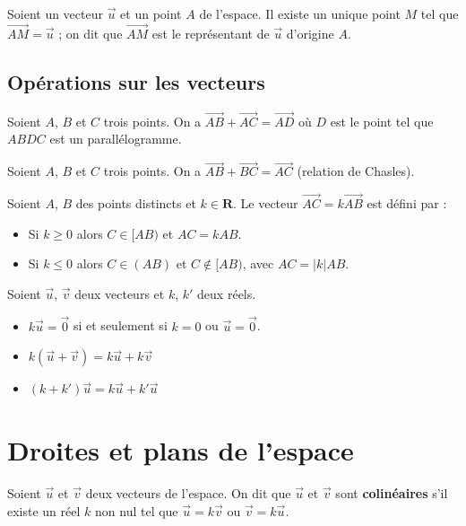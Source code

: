 \documentclass[11pt,a4paper,openany]{book}
\theoremstyle{definition}
\newcommand{\vc}[1]{\overrightarrow{#1}}
\begin{document}
    \begin{Théorème}
        Soient un vecteur $\vc{u}$ et un point $A$ de l'espace. Il existe un unique point $M$
        tel que $\vc{AM}=\vc{u}$ ; on dit que $\vc{AM}$ est le représentant de $\vc{u}$
        d'origine $A$.
    \end{Théorème}

    \subsection{Opérations sur les vecteurs}
    \begin{Propriété}
        Soient $A$, $B$ et $C$ trois points. On a $\vc{AB}+\vc{AC}=\vc{AD}$ où $D$ est le
        point tel que $ABDC$ est un parallélogramme.
    \end{Propriété}

    \begin{Propriété}
        Soient $A$, $B$ et $C$ trois points. On a $\vc{AB}+\vc{BC}=\vc{AC}$ (relation de
        Chasles).
    \end{Propriété}

    \begin{Propriété}
        Soient $A$, $B$ des points distincts et $k\in\mathbf{R}$. Le vecteur $\vc{AC}=k\vc{AB}$
        est défini par :
        \begin{itemize}
            \item Si $k\geq 0$ alors $C\in[AB)$ et $AC=kAB$.
            \item Si $k\leq 0$ alors $C\in(AB)$ et $C\notin[AB)$, avec $AC=|k|AB$.
        \end{itemize}
    \end{Propriété}

    \begin{Propriété}
        Soient $\vc{u}$, $\vc{v}$ deux vecteurs et $k$, $k'$ deux réels.
        \begin{itemize}
            \item $k\vc{u}=\vc{0}$ si et seulement si $k=0$ ou $\vc{u}=\vc{0}$.
            \item $k(\vc{u}+\vc{v})=k\vc{u}+k\vc{v}$
            \item $(k+k')\vc{u}=k\vc{u}+k'\vc{u}$
        \end{itemize}
    \end{Propriété}

    \section{Droites et plans de l'espace}
    \begin{Définition}
        Soient $\vc{u}$ et $\vc{v}$ deux vecteurs de l'espace. On dit que $\vc{u}$ et $\vc{v}$
        sont \textbf{colinéaires} s'il existe un réel $k$ non nul tel que $\vc{u}=k\vc{v}$
        ou $\vc{v}=k\vc{u}$.
    \end{Définition}
\end{document}
